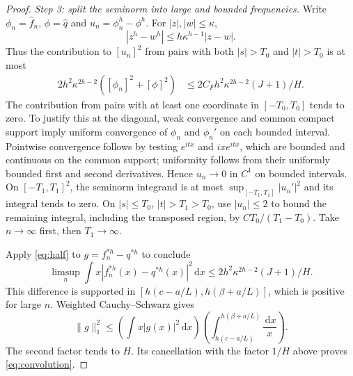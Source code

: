\documentclass[11pt]{article}
\theoremstyle{remark}\newtheorem{remark}[theorem]{Remark}
\newcommand{\dd}{\,\mathrm d}
\begin{document}
\begin{proof}
\emph{Step 3: split the seminorm into large and bounded frequencies.}
Write $\phi_n=\widehat f_n$, $\phi=\widehat q$ and $u_n=\phi_n^h-\phi^h$. For $|z|,|w|\le\kappa$,
\[
 |z^h-w^h|\le h\kappa^{h-1}|z-w|.
\]
Thus the contribution to $[u_n]^2$ from pairs with both $|s|>T_0$ and $|t|>T_0$ is at most
\begin{align*}
 2h^2\kappa^{2h-2}([\phi_n]^2+[\phi]^2)
 &\le 2C_F h^2\kappa^{2h-2}(J+1)/H.
\end{align*}
The contribution from pairs with at least one coordinate in $[-T_0,T_0]$ tends to zero. To justify this at the diagonal, weak convergence and common compact support imply uniform convergence of $\phi_n$ and $\phi_n'$ on each bounded interval. Pointwise convergence follows by testing $e^{itx}$ and $ix e^{itx}$, which are bounded and continuous on the common support; uniformity follows from their uniformly bounded first and second derivatives. Hence $u_n\to0$ in $C^1$ on bounded intervals. On $[-T_1,T_1]^2$, the seminorm integrand is at most $\sup_{[-T_1,T_1]}|u_n'|^2$ and its integral tends to zero. On $|s|\le T_0$, $|t|>T_1>T_0$, use $|u_n|\le2$ to bound the remaining integral, including the transposed region, by $C T_0/(T_1-T_0)$. Take $n\to\infty$ first, then $T_1\to\infty$.

Apply \eqref{eq:half} to $g=f_n^{*h}-q^{*h}$ to conclude
\[
 \limsup_n\int x|f_n^{*h}(x)-q^{*h}(x)|^2\dd x
 \le2h^2\kappa^{2h-2}(J+1)/H.
\]
This difference is supported in $[h(c-a/L),h(\beta+a/L)]$, which is positive for large $n$. Weighted Cauchy--Schwarz gives
\[
 \|g\|_1^2\le\left(\int x|g(x)|^2\dd x\right)
 \left(\int_{h(c-a/L)}^{h(\beta+a/L)}\frac{\dd x}x\right).
\]
The second factor tends to $H$. Its cancellation with the factor $1/H$ above proves \eqref{eq:convolution}.
\end{proof}
\end{document}
